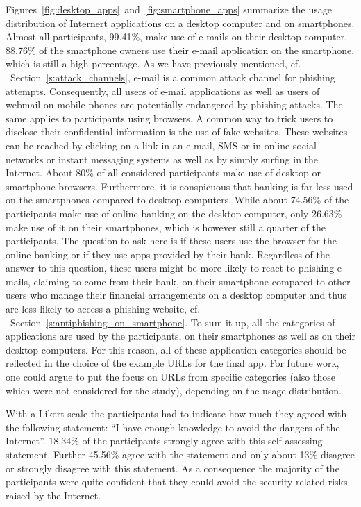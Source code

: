 \begin{description}[leftmargin=0cm]
	
	\item[Usage Distribution of Internet Applications] Figures~\ref{fig:desktop_apps}~and~\ref{fig:smartphone_apps} summarize the usage distribution of Internert applications on a desktop computer and on smartphones.
 Almost all participants, 99.41\%, make use of e-mails on their desktop computer.
 88.76\% of the smartphone owners use their e-mail application on the smartphone, which is still a high percentage.
 As we have previously mentioned, cf.
~Section~\ref{s:attack_channels}, e-mail is a common attack channel for phishing attempts.
 Consequently, all users of e-mail applications as well as users of webmail on mobile phones are potentially endangered by phishing attacks.
 The same applies to participants using browsers.
 A common way to trick users to disclose their confidential information is the use of fake websites.
 These websites can be reached by clicking on a link in an e-mail, SMS or in online social networks or instant messaging systems as well as by simply surfing in the Internet.
 About 80\% of all considered participants make use of desktop or smartphone browsers.
 Furthermore, it is conspicuous that banking is far less used on the smartphones compared to desktop computers.
 While about 74.56\% of the participants make use of online banking on the desktop computer, only 26.63\% make use of it on their smartphones, which is however still a quarter of the participants.
	The question to ask here is if these users use the browser for the online banking or if they use apps provided by their bank.
 Regardless of the answer to this question, these users might be more likely to react to phishing e-mails, claiming to come from their bank, on their smartphone compared to other users who manage their financial arrangements on a desktop computer and thus are less likely to access a phishing website, cf.
~Section~\ref{s:antiphishing_on_smartphone}. To sum it up, all the categories of applications are used by the participants, on their smartphones as well as on their desktop computers.
 For this reason, all of these application categories should be reflected in the choice of the example URLs for the final app.
 For future work, one could argue to put the focus on URLs from specific categories (also those which were not considered for the study), depending on the usage distribution.


	\item[Self-Assessment - Knowledge to avoid dangers of Internet] With a Likert scale the participants had to indicate how much they agreed with the following statement: ``I have enough knowledge to avoid the dangers of the Internet''. 18.34\% of the participants strongly agree with this self-assessing statement.
 Further 45.56\% agree with the statement and only about 13\% disagree or strongly disagree with this statement.
 As a consequence the majority of the participants were quite confident that they could avoid the security-related risks raised by the Internet.
 

\end{description}
